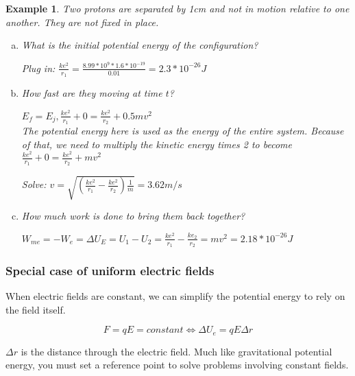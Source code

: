 \documentclass{article}
\newtheorem{example}{Example}
\begin{document}
\begin{example}
	Two protons are separated by 1cm and not in motion relative to one another. They are not fixed in place.
	\begin{enumerate}[a)]
		\item What is the initial potential energy of the configuration?

			Plug in: $ \frac{k e^2}{r_1}=\frac{8.99*10^9*1.6*10^{-19}}{0.01}=2.3*10^{-26} J$
		\item How fast are they moving at time $t$?

			$E_f=E_j, \frac{ke^2}{r_1}+0=\frac{ke^2}{r_2}+0.5 m v^2$
			\\The potential energy here is used as the energy of the entire system. Because of that, we need to multiply the kinetic energy times 2 to become $\frac{ke^2}{r_1}+0=\frac{ke^2}{r_2}+m v^2$

			Solve:
			$v=\sqrt{(\frac{ke^2}{r_1}-\frac{ke^2}{r_2})\frac{1}{m}}=3.62 m/s$
		\item How much work is done to bring them back together?

			$W_{me}=-W_e=\Delta U_E=U_1-U_2=\frac{ke^2}{r_1}-\frac{ke_2}{r_2}=mv^2=2.18*10^{-26} J$
	\end{enumerate}
\end{example}
\subsubsection{Special case of uniform electric fields}
When electric fields are constant, we can simplify the potential energy to rely on the field itself.

\begin{equation} F=qE=constant \iff \Delta U_e= q E\Delta r \end{equation}

	$\Delta r$ is the distance through the electric field. Much like gravitational potential energy, you must set a reference point to solve problems involving constant fields. 
\end{document}
